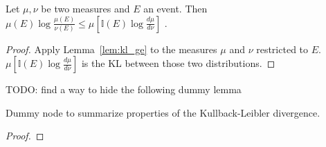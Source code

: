 \begin{lemma}
  \label{lem:expectation_llr_event}
  Let $\mu, \nu$ be two measures and $E$ an event. Then
  $\mu(E)\log\frac{\mu(E)}{\nu(E)} \le \mu\left[\mathbb{I}(E)\log \frac{d \mu}{d \nu}\right]$ .
\end{lemma}

\begin{proof}
Apply Lemma~\ref{lem:kl_ge} to the measures $\mu$ and $\nu$ restricted to $E$. $\mu\left[\mathbb{I}(E)\log \frac{d \mu}{d \nu}\right]$ is the KL between those two distributions.
\end{proof}




TODO: find a way to hide the following dummy lemma
\begin{lemma}
  \label{lem:kl_properties}
  \leanok
  Dummy node to summarize properties of the Kullback-Leibler divergence.
\end{lemma}

\begin{proof}\leanok
{}
\end{proof}